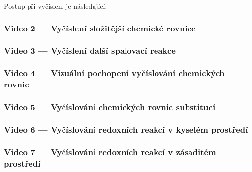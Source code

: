 \documentclass[a4paper, 12pt]{article}
\begin{document}
Postup při vyčíslení je následující:
\begin{center}



\end{center}


\subsubsection{Video 2 --- Vyčíslení složitější chemické rovnice}
\begin{center}
\end{center}

\subsubsection{Video 3 --- Vyčíslení další spalovací reakce}
\begin{center}
\end{center}


\subsubsection{Video 4 --- Vizuální pochopení vyčíslování chemických rovnic}
\begin{center}
\end{center}


\subsubsection{Video 5 --- Vyčíslování chemických rovnic substitucí}

\begin{center}
\end{center}


\subsubsection{Video 6 --- Vyčíslování redoxních reakcí v kyselém prostředí}
\begin{center}
\end{center}

\subsubsection{Video 7 --- Vyčíslování redoxních reakcí v zásaditém prostředí}
\begin{center}
\end{center}
\end{document}
